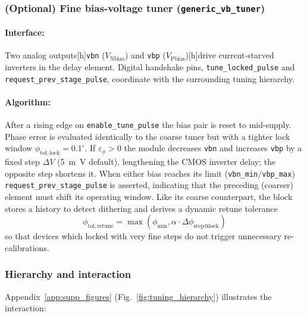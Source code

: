 \subsubsection{(Optional) Fine bias-voltage tuner (\texttt{generic\_vb\_tuner})}
\paragraph{Interface:}

Two analog
 outputs[h]\texttt{vbn} (\(V_\mathrm{N bias}\)) and \texttt{vbp} (\(V_\mathrm{P bias}\))[h]drive current-starved inverters in the delay element.
Digital handshake pins, \texttt{tune\_locked\_pulse} and
\texttt{request\_prev\_stage\_pulse}, coordinate with the surrounding
tuning hierarchy.

\paragraph{Algorithm:}

After a rising edge on \texttt{enable\_tune\_pulse} the bias pair is reset to mid-supply.
Phase error is evaluated identically to the coarse tuner but with a
tighter lock window \(\phi_\mathrm{tol,lock}=0.1^{\circ}\).
If \(\varepsilon_\phi>0\) the module decreases \texttt{vbn} and
increases \texttt{vbp} by a fixed step \(\Delta V\)
(\SI{5}{m\volt} default), lengthening the CMOS inverter delay;
the opposite step shortens it.
When either bias reaches its limit (\texttt{vbn\_min}/\texttt{vbp\_max})
\texttt{request\_prev\_stage\_pulse} is asserted, indicating that the
preceding (coarser) element must shift its operating window.
Like its coarse counterpart, the block stores a history to detect dithering and
derives a dynamic retune tolerance
\[
\phi_\mathrm{tol,retune}= \max\!\left(
                \phi_\mathrm{min},
                \alpha \cdot \Delta\!\phi_\mathrm{step@lock}
            \right)
\]
so that devices which locked with very fine steps do not trigger
unnecessary re-calibrations.

\subsubsection{Hierarchy and interaction}
Appendix~\ref{app:supp_figures} (Fig.~\ref{fig:tuning_hierarchy}) illustrates the interaction:


